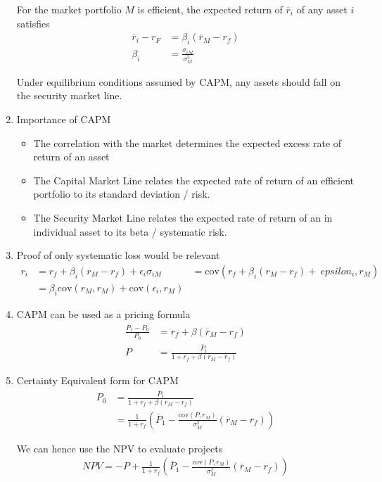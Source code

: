 \documentclass[12pt,twoside]{article}
\begin{document}
\begin{enumerate}
	 For the market portfolio $M$ is efficient, the expected return of $\overline{r}_i$ of any asset $i$ satisfies
	 \begin{align*}
	 	\overline{r}_i - r_F &= \beta_i (\overline{r}_M-r_f)\\
	 	\beta_i &=\frac{\sigma_{iM}}{\sigma^2_M}
	 \end{align*}
	 
	 Under equilibrium conditions assumed by CAPM, any assets should fall on the security market line.
	 
	 \item Importance of CAPM
	 	\begin{itemize}
	 		\item The correlation with the market determines the expected excess rate of return of an asset
	 		\item The Capital Market Line relates the expected rate of return of an efficient portfolio to its standard deviation / risk.
	 		\item The Security Market Line relates the expected rate of return of an in individual asset to its beta / systematic risk.
	 	\end{itemize}
	
	 \item Proof of only systematic loss would be relevant
	 \begin{align*}
	 	r_i 					& = r_f + \beta_i (r_M - r_f )+ \epsilon_i
	 	\sigma_{iM}		& = \text{cov} \left(r_f + \beta_i (r_M - r_f )+ \ epsilon_i, r_M\right)\\
	 							& = \beta_i \text{cov}(r_M, r_M) +  \text{cov}(\epsilon_i, r_M)
	 \end{align*}
 		
		\item CAPM can be used as a pricing formula
			\begin{align*}
				\frac{\overline{P}_1 - P_0}{P_0} &=  r_f + \beta (\overline{r}_M - r_f)\\
				P & = \frac{\overline{P}_1}{1+ r_f + \beta (\overline{r}_M - r_f)}
			\end{align*}
		
		\item Certainty Equivalent form for CAPM
		\begin{align*}
			P_0 	&= \frac{\overline{P}_1 }{1+r_f + \beta (\overline{r}_M - r_f)}\\
					& = \frac{1}{1+r_f}\left(\overline{P}_1 - \frac{\text{cov}(P, r_M)}{\sigma^2_M}(\overline{r}_M - r_f) \right)
		\end{align*}
		
		We can hence use the NPV to evaluate projects
		\begin{align*}
			NPV = -P + \frac{1}{1+r_f}\left(\overline{P}_1 - \frac{\text{cov}(P, r_M)}{\sigma^2_M}(\overline{r}_M - r_f) \right)
		\end{align*}				
		
		
\end{enumerate}
\end{document}

